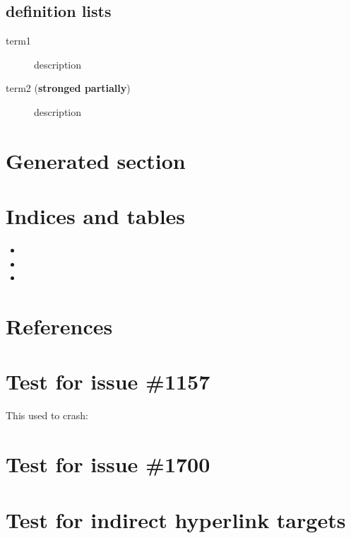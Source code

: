 \documentclass[letterpaper,10pt,english]{sphinxmanual}
\begin{document}
\section{definition lists}
\label{lists:definition-lists}\begin{description}
\item[{term1}] \leavevmode
description

\item[{term2 (\textbf{stronged partially})}] \leavevmode
description

\end{description}


\chapter{Generated section}
\label{otherext::doc}\label{otherext:id1}

\chapter{Indices and tables}
\label{contents:indices-and-tables}\begin{itemize}
\item {} 

\item {} 

\item {} 

\end{itemize}


\chapter{References}
\label{contents:references}

\chapter{Test for issue \#1157}
\label{contents:test-for-issue-1157}
This used to crash:


\chapter{Test for issue \#1700}
\label{contents:test-for-issue-1700}
{\hyperref[contents:mastertoc]{}}


\chapter{Test for indirect hyperlink targets}
\label{contents:test-for-indirect-hyperlink-targets}
{\hyperref[markup:some\string-label]{}}
\end{document}
